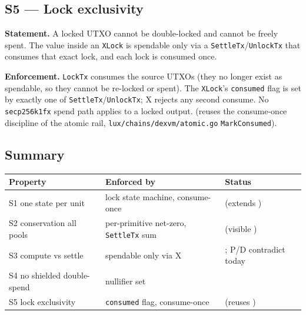 \subsection*{S5 --- Lock exclusivity}

\textbf{Statement.} A locked UTXO cannot be double-locked and cannot be
freely spent. The value inside an \texttt{XLock} is spendable only via a
\texttt{SettleTx}/\texttt{UnlockTx} that consumes that exact lock, and
each lock is consumed once.

\textbf{Enforcement.} \texttt{LockTx} consumes the source UTXOs (they no
longer exist as spendable, so they cannot be re-locked or spent). The
\texttt{XLock}'s \texttt{consumed} flag is set by exactly one of
\texttt{SettleTx}/\texttt{UnlockTx}; X rejects any second consume. No
\texttt{secp256k1fx} spend path applies to a locked output. \DESIGN{}
(reuses the \IMPL{} consume-once discipline of the atomic rail,
\texttt{lux/chains/dexvm/atomic.go} \texttt{MarkConsumed}).

\subsection*{Summary}

\begin{center}
\begin{tabular}{@{}lll@{}}
\toprule
Property & Enforced by & Status \\
\midrule
S1 one state per unit          & lock state machine, consume-once   & \DESIGN{} (extends \IMPL{}) \\
S2 conservation all pools      & per-primitive net-zero, \texttt{SettleTx} sum & \DESIGN{} (visible \IMPL{}) \\
S3 compute vs settle           & spendable only via X               & \DESIGN{}; P/D contradict today \\
S4 no shielded double-spend    & nullifier set                      & \CRYPTO{} \\
S5 lock exclusivity            & \texttt{consumed} flag, consume-once & \DESIGN{} (reuses \IMPL{}) \\
\bottomrule
\end{tabular}
\end{center}
